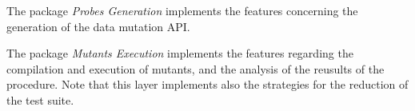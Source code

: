 The package \textit{Probes Generation} implements the features concerning the generation of the data mutation API.

The package \textit{Mutants Execution} implements the features regarding the compilation and execution of mutants, and the analysis of the reusults of the \dama procedure. Note that this layer implements also the strategies for the reduction of the test suite.


%
%
%
%
%
%
%
